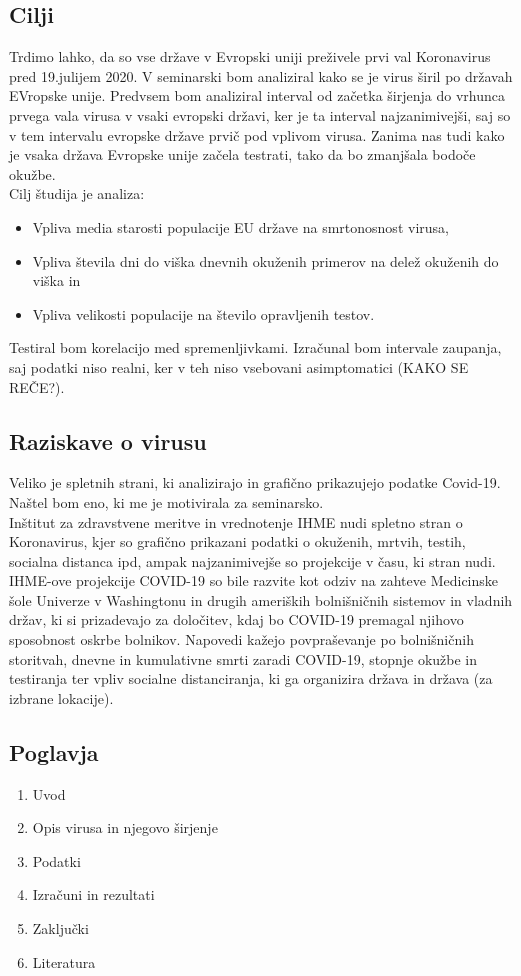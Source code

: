 \documentclass[a4paper,11pt]{article}
\begin{document}
\subsection{Cilji}
Trdimo lahko, da so vse države v Evropski uniji preživele prvi val Koronavirus pred 19.julijem 2020. V seminarski bom analiziral kako se je virus širil po državah EVropske unije. Predvsem bom analiziral interval od začetka širjenja do vrhunca prvega vala virusa v vsaki evropski državi, ker je ta interval najzanimivejši, saj so v tem intervalu evropske države prvič pod vplivom virusa. Zanima nas tudi kako je vsaka država Evropske unije začela testrati, tako da bo zmanjšala bodoče okužbe. \\
Cilj študija je analiza:
\begin{itemize}
\item{Vpliva media starosti populacije EU države na smrtonosnost virusa, }
\item{Vpliva števila dni do viška dnevnih okuženih primerov na delež okuženih do viška in }
\item{Vpliva velikosti populacije na število opravljenih testov. }
\end{itemize}
Testiral bom korelacijo med spremenljivkami. Izračunal bom intervale zaupanja, saj podatki niso realni, ker v teh niso vsebovani asimptomatici (KAKO SE REČE?).


\subsection{Raziskave o virusu}
Veliko je spletnih strani, ki analizirajo in grafično prikazujejo podatke Covid-19. Naštel bom eno, ki me je motivirala za seminarsko. \\
Inštitut za zdravstvene meritve in vrednotenje IHME nudi spletno stran o Koronavirus, kjer so grafično prikazani podatki o okuženih, mrtvih, testih, socialna distanca ipd, ampak najzanimivejše so projekcije v času, ki stran nudi. IHME-ove projekcije COVID-19 so bile razvite kot odziv na zahteve Medicinske šole Univerze v Washingtonu in drugih ameriških bolnišničnih sistemov in vladnih držav, ki si prizadevajo za določitev, kdaj bo COVID-19 premagal njihovo sposobnost oskrbe bolnikov. Napovedi kažejo povpraševanje po bolnišničnih storitvah, dnevne in kumulativne smrti zaradi COVID-19, stopnje okužbe in testiranja ter vpliv socialne distanciranja, ki ga organizira država in država (za izbrane lokacije).

\subsection{Poglavja}
\begin{enumerate}
\item{Uvod}
\item{Opis virusa in njegovo širjenje}
\item{Podatki}
\item{Izračuni in rezultati}
\item{Zaključki}
\item{Literatura}
\end{enumerate}
\end{document}
